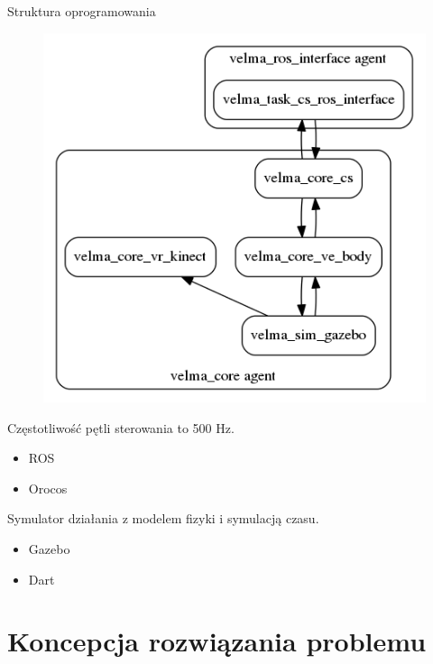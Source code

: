 \documentclass{beamer}
\begin{document}
\begin{frame}[allowframebreaks]{Struktura oprogramowania}


\begin{figure}[h]
	\centering
	\includegraphics[scale=0.3]{system}
\end{figure}

\framebreak
Częstotliwość pętli sterowania to 500 Hz.

\begin{itemize}
	\item ROS
	\item Orocos
\end{itemize}

Symulator działania z modelem fizyki i symulacją czasu.

\begin{itemize}
	\item Gazebo
	\item Dart
\end{itemize}
\end{frame}

\section{Koncepcja rozwiązania problemu}
\end{document}
